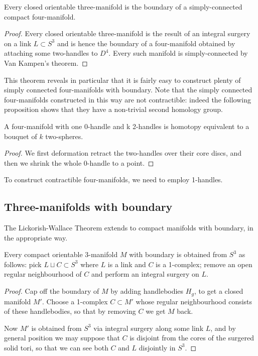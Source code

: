 \begin{cor}
Every closed orientable three-manifold is the boundary of a simply-connected compact four-manifold.
\end{cor}
\begin{proof}
Every closed orientable three-manifold is the result of an integral surgery on a link $L\subset S^3$ and is hence the boundary of a four-manifold obtained by attaching some two-handles to $D^4$. Every such manifold is simply-connected by Van Kampen's theorem.
\end{proof}

This theorem reveals in particular that it is fairly easy to construct plenty of simply connected four-manifolds with boundary. Note that the simply connected four-manifolds constructed in this way are not contractible: indeed the following proposition shows that they have a non-trivial second homology group.

\begin{prop}
A four-manifold with one 0-handle and k 2-handles is homotopy equivalent to a bouquet of $k$ two-spheres.
\end{prop}
\begin{proof}
We first deformation retract the two-handles over their core discs, and then we shrink the whole 0-handle to a point.
\end{proof}

To construct contractible four-manifolds, we need to employ 1-handles.

\subsection{Three-manifolds with boundary}
The Lickorish-Wallace Theorem extends to compact manifolds with boundary, in the appropriate way. 

\begin{prop} \label{LW:bordo:prop}
Every compact orientable 3-manifold $M$ with boundary is obtained from $S^3$ as follows: pick $L\sqcup C\subset S^3$ where $L$ is a link and $C$ is a 1-complex; remove an open regular neighbourhood of $C$ and perform an integral surgery on $L$.
\end{prop}
\begin{proof}
Cap off the boundary of $M$ by adding handlebodies $H_g$, to get a closed manifold $M'$. Choose a 1-complex $C\subset M'$ whose regular neighbourhood consists of these handlebodies, so that by removing $C$ we get $M$ back. 

Now $M'$ is obtained from $S^3$ via integral surgery along some link $L$, and by general position we may suppose that $C$ is disjoint from the cores of the surgered solid tori, so that we can see both $C$ and $L$ disjointly in $S^3$.
\end{proof}

